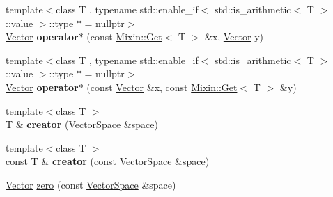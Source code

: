 \begin{DoxyCompactItemize}
\item 
{\footnotesize template$<$class T , typename std\+::enable\+\_\+if$<$ std\+::is\+\_\+arithmetic$<$ T $>$\+::value $>$\+::type $\ast$  = nullptr$>$ }\\\hyperlink{classSpacy_1_1Vector}{Vector} {\bfseries operator$\ast$} (const \hyperlink{classSpacy_1_1Mixin_1_1Get}{Mixin\+::\+Get}$<$ T $>$ \&x, \hyperlink{classSpacy_1_1Vector}{Vector} y)\hypertarget{namespaceSpacy_a0e5e7a61e6d2996df2b3e86371d38dfa}{}\label{namespaceSpacy_a0e5e7a61e6d2996df2b3e86371d38dfa}

\item 
{\footnotesize template$<$class T , typename std\+::enable\+\_\+if$<$ std\+::is\+\_\+arithmetic$<$ T $>$\+::value $>$\+::type $\ast$  = nullptr$>$ }\\\hyperlink{classSpacy_1_1Vector}{Vector} {\bfseries operator$\ast$} (const \hyperlink{classSpacy_1_1Vector}{Vector} \&x, const \hyperlink{classSpacy_1_1Mixin_1_1Get}{Mixin\+::\+Get}$<$ T $>$ \&y)\hypertarget{namespaceSpacy_a6656b636307ec4d5552477027b724f46}{}\label{namespaceSpacy_a6656b636307ec4d5552477027b724f46}

\item 
{\footnotesize template$<$class T $>$ }\\T \& {\bfseries creator} (\hyperlink{classSpacy_1_1VectorSpace}{Vector\+Space} \&space)\hypertarget{namespaceSpacy_affaca762d59da675eef594854762cdcd}{}\label{namespaceSpacy_affaca762d59da675eef594854762cdcd}

\item 
{\footnotesize template$<$class T $>$ }\\const T \& {\bfseries creator} (const \hyperlink{classSpacy_1_1VectorSpace}{Vector\+Space} \&space)\hypertarget{namespaceSpacy_aed55e3a3401be0e74e174a12858baffa}{}\label{namespaceSpacy_aed55e3a3401be0e74e174a12858baffa}

\item 
\hyperlink{classSpacy_1_1Vector}{Vector} \hyperlink{namespaceSpacy_ac7f0661bfdb52144b9ff0b9bbdd81f69}{zero} (const \hyperlink{classSpacy_1_1VectorSpace}{Vector\+Space} \&space)\hypertarget{namespaceSpacy_ac7f0661bfdb52144b9ff0b9bbdd81f69}{}\label{namespaceSpacy_ac7f0661bfdb52144b9ff0b9bbdd81f69}


\end{DoxyCompactItemize}

